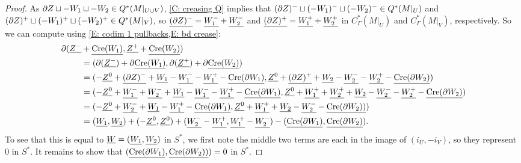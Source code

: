 \begin{proof}
	As $\partial Z \sqcup - W_1 \sqcup -W_2 \in Q^*(M|_{U \cup V})$, \cref{C: creasing Q} implies that $(\partial Z)^- \sqcup (- W_1)^- \sqcup (-W_2)^- \in Q^*(M|_U)$ and $(\partial Z)^+ \sqcup (- W_1)^+ \sqcup (-W_2)^+ \in Q^*(M|_V)$, so $\underline{(\partial Z)^- }= \underline{W_1^-} + \underline{W_2^-}$ and $\underline{(\partial Z)^+} = \underline{W_1^+} + \underline{W_2^+}$ in $C^*_\Gamma(M|_U)$ and $C^*_\Gamma(M|_V)$, respectively.
	So we can compute using \cref{E: codim 1 pullbacks,E: bd crease}:
	\begin{align*}
		\partial (\underline{Z^-}&+\underline{\mathrm{Cre}(W_1)},\underline{Z^+}+\underline{\mathrm{Cre}(W_2)})\\
		&= (\partial (\underline{Z^-})+\partial \underline{\mathrm{Cre}(W_1)},\partial (\underline{Z^+})+\partial\underline{\mathrm{Cre}(W_2)})\\
		& = (-\underline{Z^0} + \underline{(\partial Z)^-}+\underline{W_1} -\underline{W_1^-} - \underline{W_1^+} -\underline{\mathrm{Cre}(\partial W_1)},\underline{Z^0} + \underline{(\partial Z)^+} +\underline{W_2} -\underline{W_2^-} -\underline{W_2^+} -\underline{\mathrm{Cre}(\partial W_2)})\\
		& = (-\underline{Z^0} + \underline{W_1^-} + \underline{W_2^-} +\underline{W_1} -\underline{W_1^-} -\underline{W_1^+} -\underline{\mathrm{Cre}(\partial W_1)},\underline{Z^0}+ \underline{W_1^+}+ \underline{W_2^+} +\underline{W_2} -\underline{W_2^-} -\underline{W_2^+} -\underline{\mathrm{Cre}(\partial W_2)})\\
		& = (-\underline{Z^0} + \underline{W_2^-} + \underline{W_1} -\underline{W_1^+} -\underline{\mathrm{Cre}(\partial W_1)},\underline{Z^0}+ \underline{W_1^+} + \underline{W_2} -\underline{W_2^-} -\underline{\mathrm{Cre}(\partial W_2))})\\
		& = (\underline{W_1},\underline{W_2})+ (-\underline{Z^0},\underline{Z^0}) + (\underline{W_2^-}-\underline{W_1^+}, \underline{W_1^+} -\underline{W_2^-}) -(\underline{\mathrm{Cre}(\partial W_1)},\underline{\mathrm{Cre}(\partial W_2)}).
	\end{align*}
	To see that this is equal to $\underline{W} = (\underline{W_1},\underline{W_2})$ in $S^*$, we first note the middle two terms are each in the image of $(i_U, -i_V)$, so they represent $0$ in $S^*$.
	It remains to show that $(\underline{\mathrm{Cre}(\partial W_1)},\underline{\mathrm{Cre}(\partial W_2))})=0$ in $S^*$.


\end{proof}
